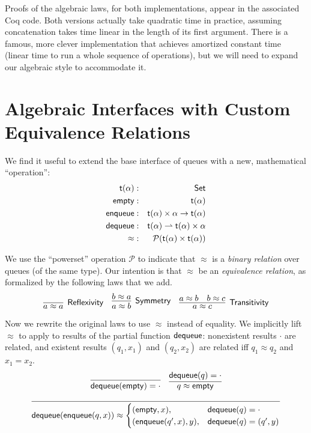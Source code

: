 \documentclass{amsbook}
\theoremstyle{definition}
\theoremstyle{remark}
\numberwithin{section}{chapter}
\numberwithin{equation}{chapter}
\begin{document}
Proofs of the algebraic laws, for both implementations, appear in the associated Coq code.
Both versions actually take quadratic time in practice, assuming concatenation takes time linear in the length of its first argument.
There is a famous, more clever implementation that achieves amortized constant time (linear time to run a whole sequence of operations), but we will need to expand our algebraic style to accommodate it.


\section{Algebraic Interfaces with Custom Equivalence Relations}

We find it useful to extend the base interface of queues with a new, mathematical ``operation'':
\begin{eqnarray*}
  \mathsf{t}(\alpha) &:& \mathsf{Set} \\
  \mathsf{empty} &:& \mathsf{t}(\alpha) \\
  \mathsf{enqueue} &:& \mathsf{t}(\alpha) \times \alpha \to \mathsf{t}(\alpha) \\
  \mathsf{dequeue} &:& \mathsf{t}(\alpha) \rightharpoonup \mathsf{t}(\alpha) \times \alpha \\
  \mathsf{\approx} &:& \mathcal P(\mathsf{t}(\alpha) \times \mathsf{t}(\alpha))
\end{eqnarray*}

We use the ``powerset'' operation $\mathcal P$ to indicate that $\approx$ is a \emph{binary relation} over queues (of the same type).
Our intention is that $\approx$ be an \emph{equivalence relation}, as formalized by the following laws that we add.
$$\infer[\mathsf{Reflexivity}]{a \approx a}{}
\quad \infer[\mathsf{Symmetry}]{a \approx b}{b \approx a}
\quad \infer[\mathsf{Transitivity}]{a \approx c}{a \approx b & b \approx c}$$

Now we rewrite the original laws to use $\approx$ instead of equality.
We implicitly lift $\approx$ to apply to results of the partial function $\mathsf{dequeue}$: nonexistent results $\cdot$ are related, and existent results $(q_1, x_1)$ and $(q_2, x_2)$ are related iff $q_1 \approx q_2$ and $x_1 = x_2$.
$$\infer{\mt{dequeue}(\mt{empty}) = \cdot}{}
\quad \infer{q \approx \mt{empty}}{\mt{dequeue}(q) = \cdot}$$

$$\infer{\mt{dequeue}(\mt{enqueue}(q, x)) \approx \begin{cases}
    (\mt{empty}, x), & \mt{dequeue}(q) = \cdot \\
    (\mt{enqueue}(q', x), y), & \mt{dequeue}(q) = (q', y)
  \end{cases}}{}$$
\end{document}
